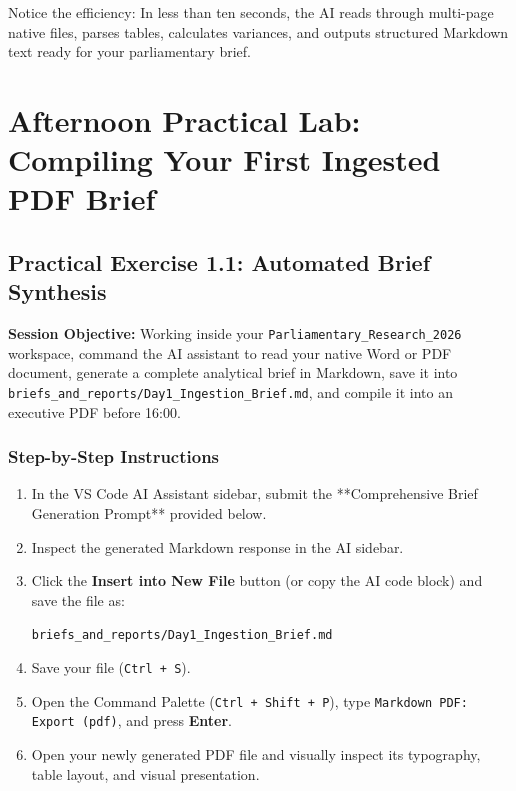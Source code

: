 \documentclass[11pt, a4paper]{report}
\begin{document}
Notice the efficiency: In less than ten seconds, the AI reads through multi-page native files, parses tables, calculates variances, and outputs structured Markdown text ready for your parliamentary brief.

\vspace{1.5em}
\noindent{}
\vspace{1.5em}

\newpage

\chapter{Afternoon Practical Lab: Compiling Your First Ingested PDF Brief}

\section{Practical Exercise 1.1: Automated Brief Synthesis}
\textbf{Session Objective:} Working inside your \texttt{Parliamentary\_Research\_2026} workspace, command the AI assistant to read your native Word or PDF document, generate a complete analytical brief in Markdown, save it into \texttt{briefs\_and\_reports/Day1\_Ingestion\_Brief.md}, and compile it into an executive PDF before 16:00.

\subsection{Step-by-Step Instructions}
\begin{enumerate}[label=\textbf{Step \arabic*:}]
    \item In the VS Code AI Assistant sidebar, submit the **Comprehensive Brief Generation Prompt** provided below.
    \item Inspect the generated Markdown response in the AI sidebar.
    \item Click the \textbf{Insert into New File} button (or copy the AI code block) and save the file as:
    \begin{center}
        \texttt{briefs\_and\_reports/Day1\_Ingestion\_Brief.md}
    \end{center}
    \item Save your file (\texttt{Ctrl + S}).
    \item Open the Command Palette (\texttt{Ctrl + Shift + P}), type \texttt{Markdown PDF: Export (pdf)}, and press \textbf{Enter}.
    \item Open your newly generated PDF file and visually inspect its typography, table layout, and visual presentation.
\end{enumerate}
\end{document}
